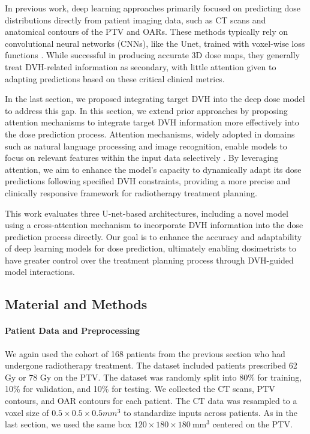 In previous work, deep learning approaches primarily focused on predicting dose distributions directly from patient imaging data, such as CT scans and anatomical contours of the PTV and OARs.
These methods typically rely on convolutional neural networks (CNNs), like the Unet, trained with voxel-wise loss functions \cite{Ronneberger2015}.
While successful in producing accurate 3D dose maps, they generally treat DVH-related information as secondary, with little attention given to adapting predictions based on these critical clinical metrics.

In the last section, we proposed integrating target DVH into the deep dose model to address this gap.
In this section, we extend prior approaches by proposing attention mechanisms to integrate target DVH information more effectively into the dose prediction process.
Attention mechanisms, widely adopted in domains such as natural language processing and image recognition, enable models to focus on relevant features within the input data selectively \cite{Niu2021}.
By leveraging attention, we aim to enhance the model's capacity to dynamically adapt its dose predictions following specified DVH constraints, providing a more precise and clinically responsive framework for radiotherapy treatment planning.

This work evaluates three U-net-based architectures, including a novel model using a cross-attention mechanism to incorporate DVH information into the dose prediction process directly.
Our goal is to enhance the accuracy and adaptability of deep learning models for dose prediction, ultimately enabling dosimetrists to have greater control over the treatment planning process through DVH-guided model interactions.

\subsection{Material and Methods}
\paragraph{Patient Data and Preprocessing}
We again used the cohort of 168 patients from the previous section who had undergone radiotherapy treatment.
The dataset included patients prescribed 62 Gy or 78 Gy on the PTV.
The dataset was randomly split into 80\% for training, 10\% for validation, and 10\% for testing.
We collected the CT scans, PTV contours, and OAR contours for each patient.
The CT data was resampled to a voxel size of $0.5 \times 0.5 \times 0.5 \textit{mm}^3$ to standardize inputs across patients.
As in the last section, we used the same box $120 \times 180 \times 180\ \text{mm}^3$ centered on the PTV.

